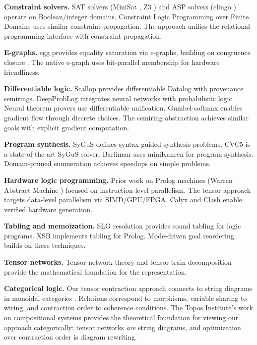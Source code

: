 \documentclass[11pt,a4paper]{article}
\begin{document}
\textbf{Constraint solvers.}
SAT solvers (MiniSat \cite{minisat_chirho}, Z3 \cite{z3_chirho}) and ASP solvers (clingo \cite{clingo_chirho}) operate on Boolean/integer domains.
Constraint Logic Programming over Finite Domains \cite{clpfd_chirho} uses similar constraint propagation.
The approach unifies the relational programming interface with constraint propagation.

\textbf{E-graphs.}
egg \cite{egg_chirho} provides equality saturation via e-graphs, building on congruence closure \cite{nelson_oppen_chirho}.
The native e-graph uses bit-parallel membership for hardware friendliness.

\textbf{Differentiable logic.}
Scallop \cite{scallop_chirho} provides differentiable Datalog with provenance semirings.
DeepProbLog \cite{deepproblog_chirho} integrates neural networks with probabilistic logic.
Neural theorem provers \cite{neural_theorem_provers_chirho} use differentiable unification.
Gumbel-softmax \cite{gumbel_softmax_chirho} enables gradient flow through discrete choices.
The semiring abstraction achieves similar goals with explicit gradient computation.

\textbf{Program synthesis.}
SyGuS \cite{sygus_chirho} defines syntax-guided synthesis problems.
CVC5 \cite{cvc5_chirho} is a state-of-the-art SyGuS solver.
Barliman \cite{barliman_chirho} uses miniKanren for program synthesis.
Domain-pruned enumeration achieves speedups on simple problems.

\textbf{Hardware logic programming.}
Prior work on Prolog machines (Warren Abstract Machine \cite{wam_chirho}) focused on instruction-level parallelism.
The tensor approach targets data-level parallelism via SIMD/GPU/FPGA.
Calyx \cite{calyx_chirho} and Clash \cite{clash_chirho} enable verified hardware generation.

\textbf{Tabling and memoization.}
SLG resolution \cite{slg_chirho} provides sound tabling for logic programs.
XSB \cite{xsb_chirho} implements tabling for Prolog.
Mode-driven goal reordering builds on these techniques.

\textbf{Tensor networks.}
Tensor network theory \cite{tensor_networks_intro_chirho} and tensor-train decomposition \cite{tensor_train_chirho} provide the mathematical foundation for the representation.

\textbf{Categorical logic.}
Our tensor contraction approach connects to string diagrams in monoidal categories \cite{selinger_string_diagrams_chirho}.
Relations correspond to morphisms, variable sharing to wiring, and contraction order to coherence conditions.
The Topos Institute's work on compositional systems \cite{fong_spivak_chirho} provides the theoretical foundation for viewing our approach categorically: tensor networks \emph{are} string diagrams, and optimization over contraction order is diagram rewriting.
\end{document}
